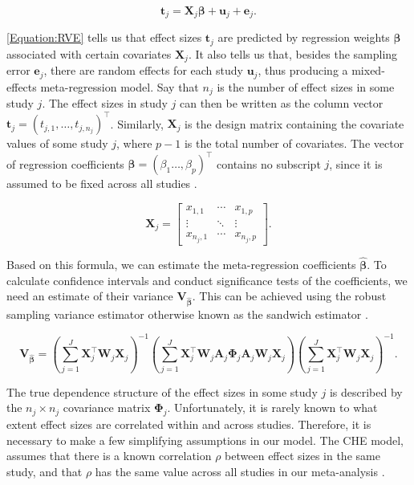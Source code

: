 \documentclass[../../../main.tex]{subfiles}
\begin{document}
\begin{equation}
\bm{t}_j = \bm{X}_j\bm{\beta} + \bm{u}_j + \bm{e}_j.
\label{Equation:RVE}
\end{equation}

\autoref{Equation:RVE} tells us that effect sizes $\bm{t}_j$ are predicted by regression weights $\bm{\beta}$ associated with certain covariates $\bm{X}_j$. It also tells us that, besides the sampling error $\bm{e}_j$, there are random effects for each study $\bm{u}_j$, thus producing a mixed-effects meta-regression model. Say that $n_j$ is the number of effect sizes in some study $j$. The effect sizes in study $j$ can then be written as the column vector $\bm{t}_j=(t_{j,1},\ldots,t_{j,n_j})^\top$. Similarly, $\bm{X}_j$ is the design matrix containing the covariate values of some study $j$, where $p-1$ is the total number of covariates.  The vector of regression coefficients $\bm{\beta}=(\beta_1\ldots,\beta_p)^\top$ contains no subscript $j$, since it is assumed to be fixed across all studies \autocite{Harrer2021}.

\begin{equation}
\bm{X}_j =
\begin{bmatrix}
x_{1,1} & \cdots & x_{1,p} \\
\vdots & \ddots & \vdots \\
x_{n_j,1} & \cdots & x_{n_j,p}
\end{bmatrix}.
\end{equation}

Based on this formula, we can estimate the meta-regression coefficients $\hat{\bm{\beta}}$. To calculate confidence intervals and conduct significance tests of the coefficients, we need an estimate of their variance $\bm{V}_{\hat{\bm{\beta}}}$. This can be achieved using the robust sampling variance estimator otherwise known as the sandwich estimator \autocite{Harrer2021}.

\begin{equation}
\bm{V}_{\hat{\bm{\beta}}} = \left(\sum_{j=1}^{J}\bm{X}_j^\top\bm{W}_j\bm{X}_j\right)^{-1} \left(\sum_{j=1}^{J}\bm{X}_j^\top\bm{W}_j\bm{A}_j\bm{\Phi}_j\bm{A}_j\bm{W}_j\bm{X}_j\right) \left(\sum_{j=1}^{J}\bm{X}_j^\top\bm{W}_j\bm{X}_j\right)^{-1}.
\end{equation}

The true dependence structure of the effect sizes in some study $j$ is described by the $n_j \times n_j$ covariance matrix $\bm{\Phi}_j$. Unfortunately, it is rarely known to what extent effect sizes are correlated within and across studies. Therefore, it is necessary to make a few simplifying assumptions in our model. The CHE model, assumes that there is a known correlation $\rho$ between effect sizes in the same study, and that $\rho$ has the same value across all studies in our meta-analysis \autocite{Harrer2021}.
\end{document}
